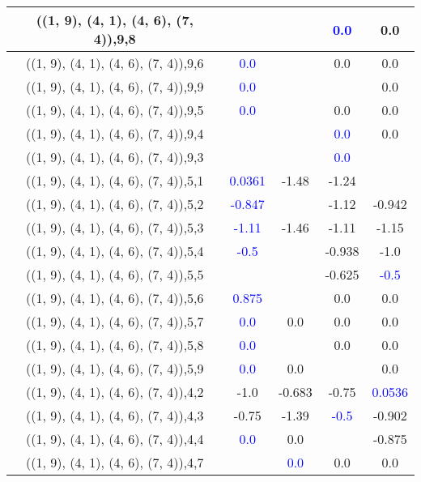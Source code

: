 \documentclass{article}
\begin{document}
\begin{center}
\begin{longtable}{|c|c|c|c|c|}
        	((1, 9), (4, 1), (4, 6), (7, 4)),9,8&&& \textcolor{blue}{0.0}&0.0\\
        	\hline
        	((1, 9), (4, 1), (4, 6), (7, 4)),9,6& \textcolor{blue}{0.0}&&0.0&0.0\\
        	\hline
        	((1, 9), (4, 1), (4, 6), (7, 4)),9,9& \textcolor{blue}{0.0}&&&0.0\\
        	\hline
        	((1, 9), (4, 1), (4, 6), (7, 4)),9,5& \textcolor{blue}{0.0}&&0.0&0.0\\
        	\hline
        	((1, 9), (4, 1), (4, 6), (7, 4)),9,4&&& \textcolor{blue}{0.0}&0.0\\
        	\hline
        	((1, 9), (4, 1), (4, 6), (7, 4)),9,3&&& \textcolor{blue}{0.0}&\\
        	\hline
        	((1, 9), (4, 1), (4, 6), (7, 4)),5,1& \textcolor{blue}{0.0361}&-1.48&-1.24&\\
        	\hline
        	((1, 9), (4, 1), (4, 6), (7, 4)),5,2& \textcolor{blue}{-0.847}&&-1.12&-0.942\\
        	\hline
        	((1, 9), (4, 1), (4, 6), (7, 4)),5,3& \textcolor{blue}{-1.11}&-1.46&-1.11&-1.15\\
        	\hline
        	((1, 9), (4, 1), (4, 6), (7, 4)),5,4& \textcolor{blue}{-0.5}&&-0.938&-1.0\\
        	\hline
        	((1, 9), (4, 1), (4, 6), (7, 4)),5,5&&&-0.625& \textcolor{blue}{-0.5}\\
        	\hline
        	((1, 9), (4, 1), (4, 6), (7, 4)),5,6& \textcolor{blue}{0.875}&&0.0&0.0\\
        	\hline
        	((1, 9), (4, 1), (4, 6), (7, 4)),5,7& \textcolor{blue}{0.0}&0.0&0.0&0.0\\
        	\hline
        	((1, 9), (4, 1), (4, 6), (7, 4)),5,8& \textcolor{blue}{0.0}&&0.0&0.0\\
        	\hline
        	((1, 9), (4, 1), (4, 6), (7, 4)),5,9& \textcolor{blue}{0.0}&0.0&&0.0\\
        	\hline
        	((1, 9), (4, 1), (4, 6), (7, 4)),4,2&-1.0&-0.683&-0.75& \textcolor{blue}{0.0536}\\
        	\hline
        	((1, 9), (4, 1), (4, 6), (7, 4)),4,3&-0.75&-1.39& \textcolor{blue}{-0.5}&-0.902\\
        	\hline
        	((1, 9), (4, 1), (4, 6), (7, 4)),4,4& \textcolor{blue}{0.0}&0.0&&-0.875\\
        	\hline
        	((1, 9), (4, 1), (4, 6), (7, 4)),4,7&& \textcolor{blue}{0.0}&0.0&0.0\\

\end{longtable}
\end{center}
\end{document}
